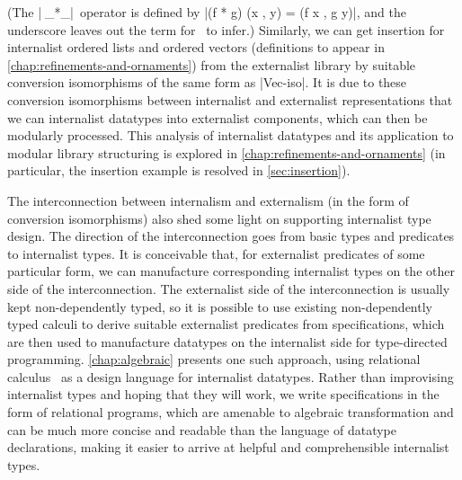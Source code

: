 \begin{center}
\end{center}
(The |^^^_*_|~operator is defined by |(f * g) (x , y) = (f x , g y)|, and the underscore leaves out the term for \Agda\ to infer.)
Similarly, we can get insertion for internalist ordered lists and ordered vectors (definitions to appear in \autoref{chap:refinements-and-ornaments}) from the externalist library by suitable conversion isomorphisms of the same form as |Vec-iso|.
It is due to these conversion isomorphisms between internalist and externalist representations that we can  internalist datatypes into externalist components, which can then be modularly processed.
This analysis of internalist datatypes and its application to modular library structuring is explored in \autoref{chap:refinements-and-ornaments} (in particular, the insertion example is resolved in \autoref{sec:insertion}).

The interconnection between internalism and externalism (in the form of conversion isomorphisms) also shed some light on supporting internalist type design.
The  direction of the interconnection goes from basic types and predicates to internalist types.
It is conceivable that, for externalist predicates of some particular form, we can manufacture corresponding internalist types on the other side of the interconnection.
The externalist side of the interconnection is usually kept non-dependently typed, so it is possible to use existing non-dependently typed calculi to derive suitable externalist predicates from specifications, which are then used to manufacture datatypes on the internalist side for type-directed programming.
\autoref{chap:algebraic} presents one such approach, using relational calculus~\citep{Bird-AoP} as a design language for internalist datatypes.
Rather than improvising internalist types and hoping that they will work, we write specifications in the form of relational programs, which are amenable to algebraic transformation and can be much more concise and readable than the language of datatype declarations, making it easier to arrive at helpful and comprehensible internalist types.

